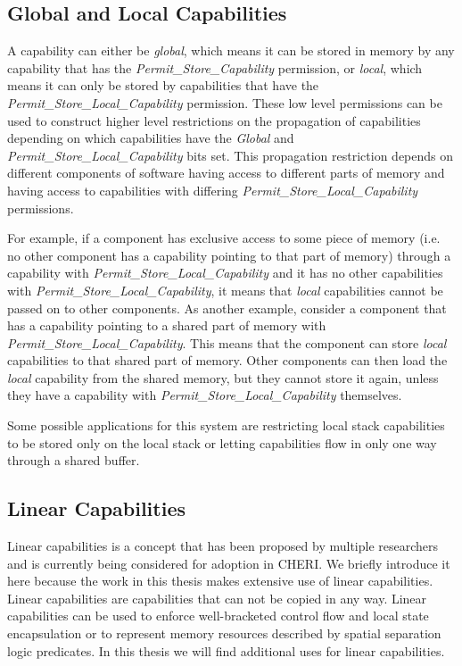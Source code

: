 \subsection{Global and Local Capabilities}
\label{sec:global}
A capability can either be \textit{global}, which means it can be stored in memory by any capability that has the \textit{Permit\_Store\_Capability} permission, or \textit{local}, which means it can only be stored by capabilities that have the \textit{Permit\_Store\_Local\_Capability} permission. These low level permissions can be used to construct higher level restrictions on the propagation of capabilities depending on which capabilities have the \textit{Global} and \textit{Permit\_Store\_Local\_Capability} bits set. This propagation restriction depends on different components of software having access to different parts of memory and having access to capabilities with differing \textit{Permit\_Store\_Local\_Capability} permissions.

For example, if a component has exclusive access to some piece of memory (i.e. no other component has a capability pointing to that part of memory) through a capability with \textit{Permit\_Store\_Local\_Capability} and it has no other capabilities with \textit{Permit\_Store\_Local\_Capability}, it means that \textit{local} capabilities cannot be passed on to other components. As another example, consider a component that has a capability pointing to a shared part of memory with \textit{Permit\_Store\_Local\_Capability}. This means that the component can store \textit{local} capabilities to that shared part of memory. Other components can then load the \textit{local} capability from the shared memory, but they cannot store it again, unless they have a capability with \textit{Permit\_Store\_Local\_Capability} themselves.

Some possible applications for this system are restricting local stack capabilities to be stored only on the local stack or letting capabilities flow in only one way through a shared buffer.\cite{UCAM-CL-TR-951} %

\subsection{Linear Capabilities}
Linear capabilities is a concept that has been proposed by multiple researchers and is currently being considered for adoption in CHERI. We briefly introduce it here because the work in this thesis makes extensive use of linear capabilities. Linear capabilities are capabilities that can not be copied in any way. Linear capabilities can be used to enforce well-bracketed control flow and local state encapsulation \cite{10.1145/3290332} or to represent memory resources described by spatial separation logic predicates.\cite{10.1145/3341688} In this thesis we will find additional uses for linear capabilities.

